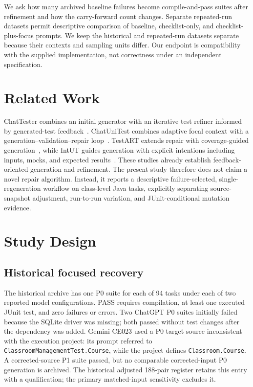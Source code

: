 \documentclass[conference]{IEEEtran}
\begin{document}
We ask how many archived baseline failures become compile-and-pass suites after refinement and how the carry-forward count changes. Separate repeated-run datasets permit descriptive comparison of baseline, checklist-only, and checklist-plus-focus prompts. We keep the historical and repeated-run datasets separate because their contexts and sampling units differ. Our endpoint is compatibility with the supplied implementation, not correctness under an independent specification.

\section{Related Work}
ChatTester combines an initial generator with an iterative test refiner informed by generated-test feedback~\cite{chattester}. ChatUniTest combines adaptive focal context with a generation--validation--repair loop~\cite{chatunitest}. TestART extends repair with coverage-guided generation~\cite{testart}, while IntUT guides generation with explicit intentions including inputs, mocks, and expected results~\cite{intut}. These studies already establish feedback-oriented generation and refinement. The present study therefore does not claim a novel repair algorithm. Instead, it reports a descriptive failure-selected, single-regeneration workflow on class-level Java tasks, explicitly separating source-snapshot adjustment, run-to-run variation, and JUnit-conditional mutation evidence.

\section{Study Design}
\subsection{Historical focused recovery}
The historical archive has one P0 suite for each of 94 tasks under each of two reported model configurations. PASS requires compilation, at least one executed JUnit test, and zero failures or errors. Two ChatGPT P0 suites initially failed because the SQLite driver was missing; both passed without test changes after the dependency was added. Gemini CE023 used a P0 target source inconsistent with the execution project: its prompt referred to \texttt{ClassroomManagementTest.Course}, while the project defines \texttt{Classroom.Course}. A corrected-source P1 suite passed, but no comparable corrected-input P0 generation is archived. The historical adjusted 188-pair register retains this entry with a qualification; the primary matched-input sensitivity excludes it.
\end{document}
